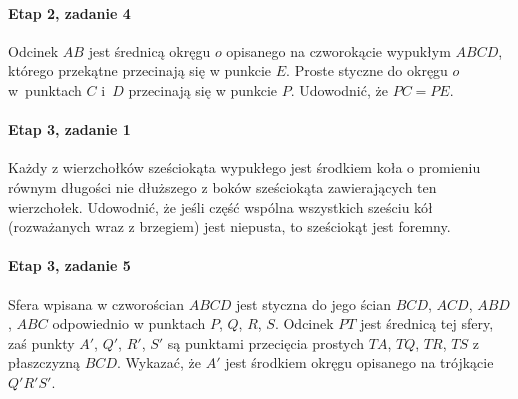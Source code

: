 \paragraph{Etap 2, zadanie 4}
Odcinek $AB$ jest średnicą okręgu $o$ opisanego na czworokącie wypukłym $ABCD$, którego przekątne przecinają się w punkcie $E$. Proste styczne do okręgu $o$ w~punktach $C$ i~$D$ przecinają się w punkcie $P$.
Udowodnić, że $PC = PE$.

\paragraph{Etap 3, zadanie 1}
Każdy z wierzchołków sześciokąta wypukłego jest środkiem koła o promieniu równym długości nie dłuższego z boków sześciokąta zawierających ten wierzchołek.
Udowodnić, że jeśli część wspólna wszystkich sześciu kół (rozważanych wraz z brzegiem) jest niepusta, to sześciokąt jest foremny.

\paragraph{Etap 3, zadanie 5}
Sfera wpisana w czworościan $ABCD$ jest styczna do jego ścian $BCD$, $ACD$, $ABD$, $ABC$ odpowiednio w punktach $P$, $Q$, $R$, $S$.
Odcinek $PT$ jest średnicą tej sfery, zaś punkty $A'$, $Q'$, $R'$, $S'$ są punktami przecięcia prostych $TA$, $TQ$, $TR$, $TS$ z płaszczyzną $BCD$.
Wykazać, że $A'$ jest środkiem okręgu opisanego na trójkącie $Q'R'S'$.
